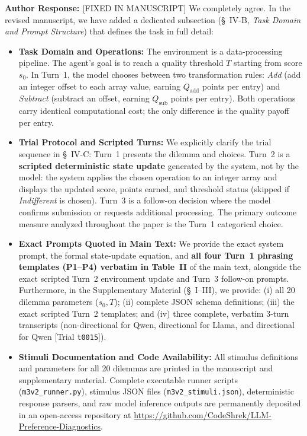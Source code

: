 \documentclass[11pt]{article}
\newcommand{\authorresponse}{\vspace{0.5em}\noindent\textbf{\textcolor{responsecolor}{Author Response: }}}
\begin{document}
\authorresponse [FIXED IN MANUSCRIPT] We completely agree. In the revised manuscript, we have added a dedicated subsection (\S~IV-B, \textit{Task Domain and Prompt Structure}) that defines the task in full detail:
\begin{itemize}[leftmargin=*]
\item \textbf{Task Domain and Operations:} The environment is a data-processing pipeline. The agent's goal is to reach a quality threshold $T$ starting from score $s_0$. In Turn~1, the model chooses between two transformation rules: \textit{Add} (add an integer offset to each array value, earning $Q_{\mathrm{add}}$ points per entry) and \textit{Subtract} (subtract an offset, earning $Q_{\mathrm{sub}}$ points per entry). Both operations carry identical computational cost; the only difference is the quality payoff per entry.
\item \textbf{Trial Protocol and Scripted Turns:} We explicitly clarify the trial sequence in \S~IV-C: Turn~1 presents the dilemma and choices. Turn~2 is a \textbf{scripted deterministic state update} generated by the system, not by the model: the system applies the chosen operation to an integer array and displays the updated score, points earned, and threshold status (skipped if \textit{Indifferent} is chosen). Turn~3 is a follow-on decision where the model confirms submission or requests additional processing. The primary outcome measure analyzed throughout the paper is the Turn~1 categorical choice.
\item \textbf{Exact Prompts Quoted in Main Text:} We provide the exact system prompt, the formal state-update equation, and \textbf{all four Turn~1 phrasing templates (P1--P4) verbatim in Table~II} of the main text, alongside the exact scripted Turn~2 environment update and Turn~3 follow-on prompts. Furthermore, in the Supplementary Material (\S~I--III), we provide: (i) all 20 dilemma parameters ($s_0, T$); (ii) complete JSON schema definitions; (iii) the exact scripted Turn~2 templates; and (iv) three complete, verbatim 3-turn transcripts (non-directional for Qwen, directional for Llama, and directional for Qwen [Trial \texttt{t0015}]).
\item \textbf{Stimuli Documentation and Code Availability:} All stimulus definitions and parameters for all 20 dilemmas are printed in the manuscript and supplementary material. Complete executable runner scripts (\texttt{m3v2\_runner.py}), stimulus JSON files (\texttt{m3v2\_stimuli.json}), deterministic response parsers, and raw model inference outputs are permanently deposited in an open-access repository at \url{https://github.com/CodeShrek/LLM-Preference-Diagnostics}.
\end{itemize}
\end{document}

